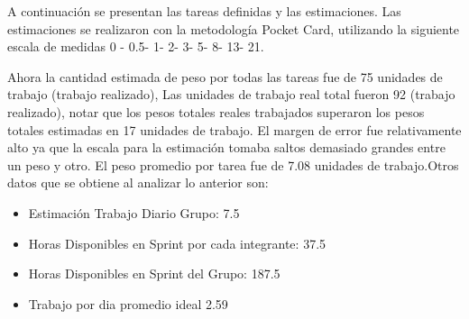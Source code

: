 \documentclass{memoria}
\begin{document}
\newpage

A continuación se presentan las tareas definidas y las estimaciones. Las estimaciones se realizaron con la metodología Pocket Card, utilizando la siguiente escala de medidas 0 - 0.5- 1- 2- 3- 5- 8- 13- 21.




Ahora la cantidad estimada de peso por todas las tareas fue de 75 unidades de trabajo (trabajo realizado), Las unidades de trabajo real total fueron 92 (trabajo realizado), notar que los pesos totales reales trabajados superaron los pesos totales estimadas en 17 unidades de trabajo.  El margen de error fue relativamente alto ya que la escala para la estimación tomaba saltos demasiado grandes entre un peso y otro. El peso promedio por tarea fue de 7.08 unidades de trabajo.Otros datos que se obtiene al analizar lo anterior son:

\begin{itemize}
	\item Estimación Trabajo Diario Grupo: 7.5 
	\item Horas Disponibles en Sprint por cada integrante: 37.5 
	\item Horas Disponibles en Sprint del Grupo: 187.5 
	\item Trabajo por dia promedio ideal 2.59 
\end{itemize}
\end{document}
